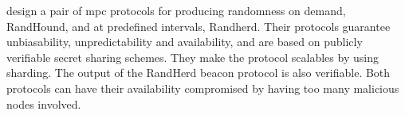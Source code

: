 \item[Scalable Bias-Resistant Distributed Randomness]
\citet{syta2017scalable} design a pair of \gls{mpc} protocols for producing randomness on demand, RandHound,  and at predefined intervals, Randherd. Their protocols guarantee unbiasability, unpredictability and availability, and are based on publicly verifiable secret sharing schemes.  They make the protocol scalables by using sharding. The output of the RandHerd beacon protocol is also verifiable. Both protocols can have their availability compromised by having too many malicious nodes involved.  